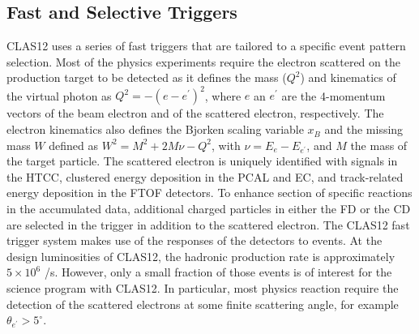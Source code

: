 \documentclass[final,3p,twocolumn]{elsarticle}
\begin{document}
\subsection{Fast and Selective Triggers} 

CLAS12 uses a series of fast triggers that are tailored to a specific event pattern selection. Most of 
the physics experiments require the electron scattered on the production target to be detected as it defines
the mass ($Q^2$) and kinematics of the virtual photon as $Q^2 = -(e - e^\prime)^2$, where $e$ an $e^\prime$ are 
the 4-momentum vectors of the beam electron and of the scattered electron, respectively. The electron kinematics 
also defines the Bjorken scaling variable $x_B$  and the missing mass $W$ defined as $W^2 = M^2 + 2M\nu - Q^2$,
with $\nu = E_e - E_{e^\prime}$, and $M$ the mass of the target particle. The scattered electron is uniquely identified
with signals in the HTCC, clustered energy deposition  in the PCAL and EC, and track-related energy deposition 
in the FTOF detectors.   
To enhance section of specific reactions in the accumulated data, additional charged particles in either the FD or 
the CD are selected in the trigger in addition to the 
scattered electron. The CLAS12 fast trigger system makes use of the responses of the detectors to events. 
At the design luminosities of 
CLAS12, the hadronic production rate is approximately $5 \times 10^6$ /s. 
However, only a small fraction of those events is of interest for the science program with CLAS12. In particular, most 
physics reaction require the detection of the scattered electrons at some finite scattering angle, for example 
$\theta_{e^\prime} > 5^\circ$.  
   
\end{document}
